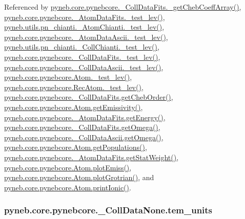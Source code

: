 Referenced by \hyperlink{pynebcore_8py_source_l00734}{pyneb.\+core.\+pynebcore.\+\_\+\+Coll\+Data\+Fits.\+\_\+get\+Cheb\+Coeff\+Array()}, \hyperlink{pynebcore_8py_source_l00171}{pyneb.\+core.\+pynebcore.\+\_\+\+Atom\+Data\+Fits.\+\_\+test\+\_\+lev()}, \hyperlink{pn__chianti_8py_source_l00284}{pyneb.\+utils.\+pn\+\_\+chianti.\+\_\+\+Atom\+Chianti.\+\_\+test\+\_\+lev()}, \hyperlink{pynebcore_8py_source_l00435}{pyneb.\+core.\+pynebcore.\+\_\+\+Atom\+Data\+Ascii.\+\_\+test\+\_\+lev()}, \hyperlink{pn__chianti_8py_source_l00449}{pyneb.\+utils.\+pn\+\_\+chianti.\+\_\+\+Coll\+Chianti.\+\_\+test\+\_\+lev()}, \hyperlink{pynebcore_8py_source_l00660}{pyneb.\+core.\+pynebcore.\+\_\+\+Coll\+Data\+Fits.\+\_\+test\+\_\+lev()}, \hyperlink{pynebcore_8py_source_l01026}{pyneb.\+core.\+pynebcore.\+\_\+\+Coll\+Data\+Ascii.\+\_\+test\+\_\+lev()}, \hyperlink{pynebcore_8py_source_l01459}{pyneb.\+core.\+pynebcore.\+Atom.\+\_\+test\+\_\+lev()}, \hyperlink{pynebcore_8py_source_l02596}{pyneb.\+core.\+pynebcore.\+Rec\+Atom.\+\_\+test\+\_\+lev()}, \hyperlink{pynebcore_8py_source_l00694}{pyneb.\+core.\+pynebcore.\+\_\+\+Coll\+Data\+Fits.\+get\+Cheb\+Order()}, \hyperlink{pynebcore_8py_source_l01716}{pyneb.\+core.\+pynebcore.\+Atom.\+get\+Emissivity()}, \hyperlink{pynebcore_8py_source_l00268}{pyneb.\+core.\+pynebcore.\+\_\+\+Atom\+Data\+Fits.\+get\+Energy()}, \hyperlink{pynebcore_8py_source_l00811}{pyneb.\+core.\+pynebcore.\+\_\+\+Coll\+Data\+Fits.\+get\+Omega()}, \hyperlink{pynebcore_8py_source_l01063}{pyneb.\+core.\+pynebcore.\+\_\+\+Coll\+Data\+Ascii.\+get\+Omega()}, \hyperlink{pynebcore_8py_source_l01496}{pyneb.\+core.\+pynebcore.\+Atom.\+get\+Populations()}, \hyperlink{pynebcore_8py_source_l00242}{pyneb.\+core.\+pynebcore.\+\_\+\+Atom\+Data\+Fits.\+get\+Stat\+Weight()}, \hyperlink{pynebcore_8py_source_l02313}{pyneb.\+core.\+pynebcore.\+Atom.\+plot\+Emiss()}, \hyperlink{pynebcore_8py_source_l02372}{pyneb.\+core.\+pynebcore.\+Atom.\+plot\+Grotrian()}, and \hyperlink{pynebcore_8py_source_l02167}{pyneb.\+core.\+pynebcore.\+Atom.\+print\+Ionic()}.

\hypertarget{classpyneb_1_1core_1_1pynebcore_1_1___coll_data_none_afc8b4905545401491edcb56c8f0b556e}{}
\subsubsection[{tem\+\_\+units}]{\setlength{\rightskip}{0pt plus 5cm}pyneb.\+core.\+pynebcore.\+\_\+\+Coll\+Data\+None.\+tem\+\_\+units}\label{classpyneb_1_1core_1_1pynebcore_1_1___coll_data_none_afc8b4905545401491edcb56c8f0b556e}


